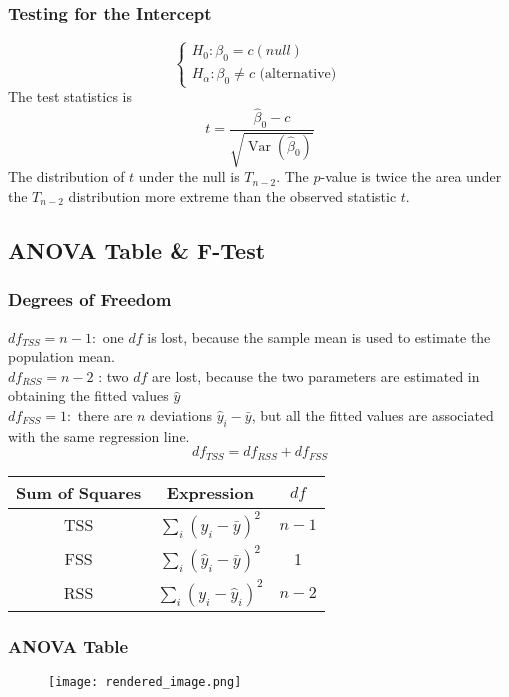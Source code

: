 \documentclass[11pt,a4paper]{article}
\begin{document}
\subsubsection{Testing for the Intercept}
$$
\left\{\begin{array}{l}
H_{0}: \beta_{0}=c(n u l l) \\
H_{\alpha}: \beta_{0} \neq c \text { (alternative) }
\end{array}\right.
$$
The test statistics is
$$
t=\frac{\hat{\beta}_{0}-c}{\sqrt{\operatorname{Var}\left(\hat{\beta}_{0}\right)}}
$$
The distribution of $t$ under the null is $T_{n-2}$.
The $p$-value is twice the area under the $T_{n-2}$ distribution more extreme than the observed statistic $t$.

\subsection{ANOVA Table \& F-Test}
\subsubsection{Degrees of Freedom}
$d f_{T S S}=n-1:$ one $d f$ is lost, because the sample mean is used to estimate the population mean.\\
$d f_{R S S}=n-2$ : two $d f$ are lost, because the two parameters are estimated in obtaining the fitted values $\hat{y}$\\
$d f_{F S S}=1:$ there are $n$ deviations $\hat{y}_{i}-\bar{y}$, but all the fitted values are associated with the same regression line.
$$d f_{T S S}=d f_{R S S}+d f_{F S S}$$
\begin{center}
\begin{tabular}{ccc}
\hline Sum of Squares & Expression & $d f$ \\
\hline \hline TSS & $\sum_{i}\left(y_{i}-\bar{y}\right)^{2}$ & $n-1$ \\
FSS & $\sum_{i}\left(\hat{y}_{i}-\bar{y}\right)^{2}$ & 1 \\
RSS & $\sum_{i}\left(y_{i}-\hat{y}_{i}\right)^{2}$ & $n-2$ \\
\hline
\end{tabular}
\end{center}

\subsubsection{ANOVA Table}

\begin{center}\begin{figure}[htbp]
    \centering
    \texttt{[image: rendered\_image.png]}
    \caption{}
    \label{}
\end{figure}\end{center}
\end{document}
